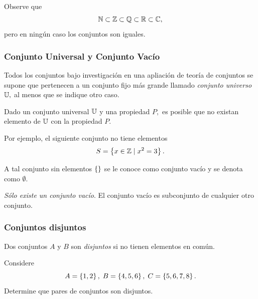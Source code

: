 \documentclass[xcolor={svgnames},
  hyperref={colorlinks}, 
  spanish, 12pt]{beamer}
\numberwithin{equation}{section} %
\numberwithin{figure}{section} %
\begin{document}
\begin{frame}
 Observe que
$$
\mathbb{N} \subset \mathbb{Z} \subset \mathbb{Q} \subset \mathbb{R} \subset \mathbb{C},
$$ pero en ning\'un caso los conjuntos son iguales. 
\end{frame}

\subsubsection{Conjunto Universal y Conjunto Vac\'io}

\begin{frame}
 Todos los conjuntos bajo investigaci\'on en una apliaci\'on de teor\'ia de conjuntos se supone que pertenecen a un conjunto fijo m\'as grande llamado \emph{conjunto universo} $\mathbb{U},$ al menos que se indique otro caso.
\end{frame}

\begin{frame}
 Dado un conjunto universal $\mathbb{U}$ y una propiedad $P,$ es posible que no existan elemento de $\mathbb{U}$ con la propiedad $P.$ 
\end{frame}

\begin{frame}
 Por ejemplo, el siguiente conjunto no tiene elementos
 $$
 S=\left\{ x\in \mathbb{Z} \mid x^{2}=3 \right\}.
 $$
\end{frame}

\begin{frame}
 A tal conjunto sin elementos $\left\{  \right\}$ se le conoce como conjunto vac\'io y se denota como $\emptyset.$
\end{frame}

\begin{frame}
 \begin{rem}
  \emph{S\'olo existe un conjunto vac\'io}. \pause El conjunto vac\'io es subconjunto de cualquier otro conjunto.
 \end{rem}

\end{frame}

\subsubsection{Conjuntos disjuntos}

\begin{frame}
Dos conjuntos $A$ y $B$ son \emph{disjuntos} si no tienen elementos en com\'un. 
\end{frame}

\begin{frame}
 \begin{exmp}
  Considere $$
  A=\left\{ 1,2 \right\}, \; B=\left\{ 4,5,6 \right\}, \; C=\left\{ 5,6,7,8 \right\}.
  $$
  Determine que pares de conjuntos son disjuntos. 
 \end{exmp}

\end{frame}
\end{document}
